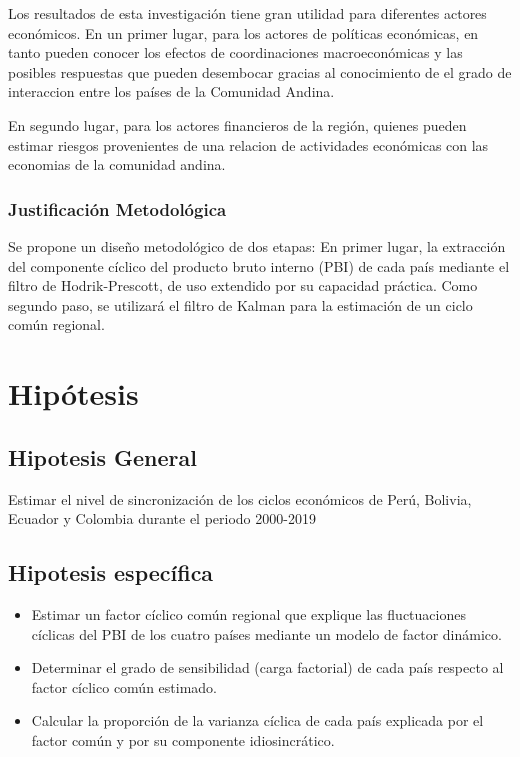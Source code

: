 \documentclass[
  spanish,
  11pt,
  letterpaper,
  letterpaper,
  12pt]{book}
\begin{document}
Los resultados de esta investigación tiene gran utilidad para diferentes
actores económicos. En un primer lugar, para los actores de políticas
económicas, en tanto pueden conocer los efectos de coordinaciones
macroeconómicas y las posibles respuestas que pueden desembocar gracias
al conocimiento de el grado de interaccion entre los países de la
Comunidad Andina.

En segundo lugar, para los actores financieros de la región, quienes
pueden estimar riesgos provenientes de una relacion de actividades
económicas con las economias de la comunidad andina.

\subsection{Justificación
Metodológica}\label{justificaciuxf3n-metodoluxf3gica}

Se propone un diseño metodológico de dos etapas: En primer lugar, la
extracción del componente cíclico del producto bruto interno (PBI) de
cada país mediante el filtro de Hodrik-Prescott, de uso extendido por su
capacidad práctica. Como segundo paso, se utilizará el filtro de Kalman
para la estimación de un ciclo común regional.

\chapter{Hipótesis}\label{hipuxf3tesis}

\section{Hipotesis General}\label{hipotesis-general}

Estimar el nivel de sincronización de los ciclos económicos de Perú,
Bolivia, Ecuador y Colombia durante el periodo 2000-2019

\section{Hipotesis específica}\label{hipotesis-especuxedfica}

\begin{itemize}
\item
  Estimar un factor cíclico común regional que explique las
  fluctuaciones cíclicas del PBI de los cuatro países mediante un modelo
  de factor dinámico.
\item
  Determinar el grado de sensibilidad (carga factorial) de cada país
  respecto al factor cíclico común estimado.
\item
  Calcular la proporción de la varianza cíclica de cada país explicada
  por el factor común y por su componente idiosincrático.
\end{itemize}
\end{document}
